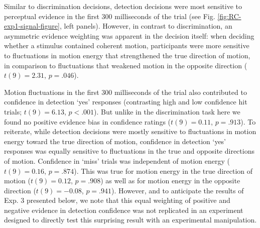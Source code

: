 \documentclass[12pt,twoside]{reedthesis}
\begin{document}
Similar to discrimination decisions, detection decisions were most sensitive to perceptual evidence in the first 300 milliseconds of the trial (see Fig. \ref{fig:RC-exp1-signal-figure}, left panels). However, in contrast to discrimination, an asymmetric evidence weighting was apparent in the decision itself: when deciding whether a stimulus contained coherent motion, participants were more sensitive to fluctuations in motion energy that strengthened the true direction of motion, in comparison to fluctuations that weakened motion in the opposite direction (\(t(9) = 2.31\), \(p = .046\)).

Motion fluctuations in the first 300 milliseconds of the trial also contributed to confidence in detection `yes' responses (contrasting high and low confidence hit trials; \(t(9) = 6.13\), \(p < .001\)). But unlike in the discrimination task here we found no positive evidence bias in confidence ratings (\(t(9) = 0.11\), \(p = .913\)). To reiterate, while detection decisions were mostly sensitive to fluctuations in motion energy toward the true direction of motion, confidence in detection `yes' responses was equally sensitive to fluctuations in the true and opposite directions of motion.
Confidence in `miss' trials was independent of motion energy (\(t(9) = 0.16\), \(p = .874\)). This was true for motion energy in the true direction of motion (\(t(9) = 0.12\), \(p = .908\)) as well as for motion energy in the opposite direction (\(t(9) = -0.08\), \(p = .941\)). However, and to anticipate the results of Exp. 3 presented below, we note that this equal weighting of positive and negative evidence in detection confidence was not replicated in an experiment designed to directly test this surprising result with an experimental manipulation.
\end{document}
